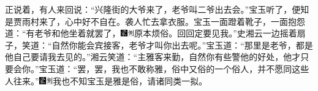 正说着，有人来回说：``兴隆街的大爷来了，老爷叫二爷出去会。''宝玉听了，便知是贾雨村来了，心中好不自在。袭人忙去拿衣服。宝玉一面蹬着靴子，一面抱怨道：``有老爷和他坐着就罢了，{\includegraphics[width=3mm]{../Images/00006}\includegraphics[width=3mm]{../Images/00011}\footnotesize \kaishu 原本烦俗。}回回定要见我。''史湘云一边摇着扇子，笑道：``自然你能会宾接客，老爷才叫你出去呢。''宝玉道：``那里是老爷，都是他自己要请我去见的。''湘云笑道：``主雅客来勤，自然你有些警他的好处，他才只要会你。''宝玉道：``罢，罢，我也不敢称雅，俗中又俗的一个俗人，并不愿同这些人往来。''{\includegraphics[width=3mm]{../Images/00006}\includegraphics[width=3mm]{../Images/00011}\footnotesize \kaishu 我也不知宝玉是雅是俗，请诸同类一拟。}

